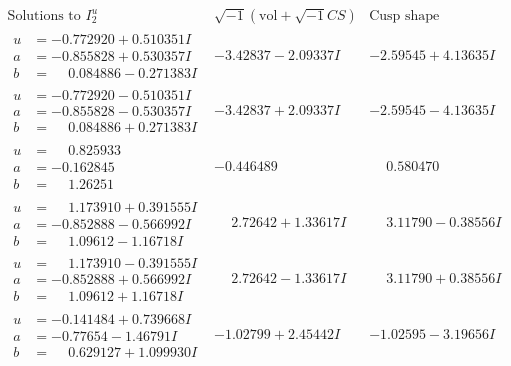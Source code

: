 \documentclass[1p]{elsarticle_modified}
\theoremstyle{definition}
\newcommand{\I}{\sqrt{-1}}
\begin{document}
$$\begin{array}{c|c|c}  
\text{Solutions to }I^u_{2}& \I (\text{vol} + \sqrt{-1}CS) & \text{Cusp shape}\\
 \hline 
\begin{aligned}
u &= -0.772920 + 0.510351 I \\
a &= -0.855828 + 0.530357 I \\
b &= \phantom{-}0.084886 - 0.271383 I\end{aligned}
 & -3.42837 - 2.09337 I & -2.59545 + 4.13635 I \\ \hline\begin{aligned}
u &= -0.772920 - 0.510351 I \\
a &= -0.855828 - 0.530357 I \\
b &= \phantom{-}0.084886 + 0.271383 I\end{aligned}
 & -3.42837 + 2.09337 I & -2.59545 - 4.13635 I \\ \hline\begin{aligned}
u &= \phantom{-}0.825933\phantom{ +0.000000I} \\
a &= -0.162845\phantom{ +0.000000I} \\
b &= \phantom{-}1.26251\phantom{ +0.000000I}\end{aligned}
 & -0.446489\phantom{ +0.000000I} & \phantom{-}0.580470\phantom{ +0.000000I} \\ \hline\begin{aligned}
u &= \phantom{-}1.173910 + 0.391555 I \\
a &= -0.852888 - 0.566992 I \\
b &= \phantom{-}1.09612 - 1.16718 I\end{aligned}
 & \phantom{-}2.72642 + 1.33617 I & \phantom{-}3.11790 - 0.38556 I \\ \hline\begin{aligned}
u &= \phantom{-}1.173910 - 0.391555 I \\
a &= -0.852888 + 0.566992 I \\
b &= \phantom{-}1.09612 + 1.16718 I\end{aligned}
 & \phantom{-}2.72642 - 1.33617 I & \phantom{-}3.11790 + 0.38556 I \\ \hline\begin{aligned}
u &= -0.141484 + 0.739668 I \\
a &= -0.77654 - 1.46791 I \\
b &= \phantom{-}0.629127 + 1.099930 I\end{aligned}
 & -1.02799 + 2.45442 I & -1.02595 - 3.19656 I \\ \hline\begin{aligned}

\end{aligned}
\end{array}$$
\end{document}

